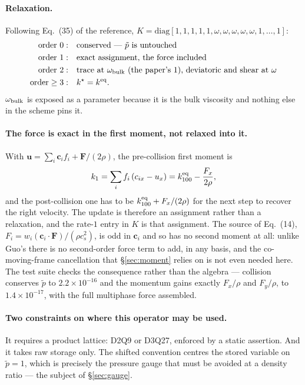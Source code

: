 \documentclass[11pt,a4paper]{article}
\newcommand{\cs}{c_s}
\newcommand{\ci}{\bm{c}_i}
\newcommand{\uu}{\bm{u}}
\newcommand{\e}[1]{\times 10^{#1}}
\begin{document}
\paragraph{Relaxation.} Following Eq.~(35) of the reference,
$K=\mathrm{diag}[1,1,1,1,1,\omega,\omega,\omega,\omega,\omega,1,\ldots,1]$:
\begin{equation}
\begin{aligned}
  \text{order }0:&\quad \text{conserved --- } \tilde p \text{ is untouched} \\
  \text{order }1:&\quad \text{exact assignment, the force included} \\
  \text{order }2:&\quad \text{trace at }\omega_{\rm bulk}\text{ (the paper's }1\text{),
                          deviatoric and shear at }\omega \\
  \text{order}\geq3:&\quad k^{\star} = k^{\rm eq}.
\end{aligned}
\end{equation}
$\omega_{\rm bulk}$ is exposed as a parameter because it is the bulk viscosity and
nothing else in the scheme pins it.

\paragraph{The force is exact in the first moment, not relaxed into it.} With
$\uu=\sum_i\ci f_i + \bm{F}/(2\rho)$, the pre-collision first moment is
\begin{equation}
  k_1 = \sum_i f_i\,(c_{ix}-u_x) = k^{\rm eq}_{100} - \frac{F_x}{2\rho},
  \label{eq:mpk1}
\end{equation}
and the post-collision one has to be $k^{\rm eq}_{100}+F_x/(2\rho)$ for the next
step to recover the right velocity. The update is therefore an assignment rather
than a relaxation, and the rate-$1$ entry in $K$ is that assignment. The source of
Eq.~(14), $F_i = w_i(\ci\!\cdot\!\bm{F})/(\rho\cs^2)$, is odd in $\ci$ and so has
no second moment at all: unlike Guo's there is no second-order force term to add,
in any basis, and the co-moving-frame cancellation that \S\ref{sec:moment} relies
on is not even needed here. The test suite checks the consequence rather than the
algebra --- collision conserves $\tilde p$ to $2.2\e{-16}$ and the momentum gains
exactly $F_x/\rho$ and $F_y/\rho$, to $1.4\e{-17}$, with the full multiphase force
assembled.

\paragraph{Two constraints on where this operator may be used.} It requires a
product lattice: D2Q9 or D3Q27, enforced by a static assertion. And it takes raw storage
only. The shifted convention centres the stored variable on $\tilde p = 1$, which
is precisely the pressure gauge that must be avoided at a density ratio --- the
subject of \S\ref{sec:gauge}.
\end{document}
